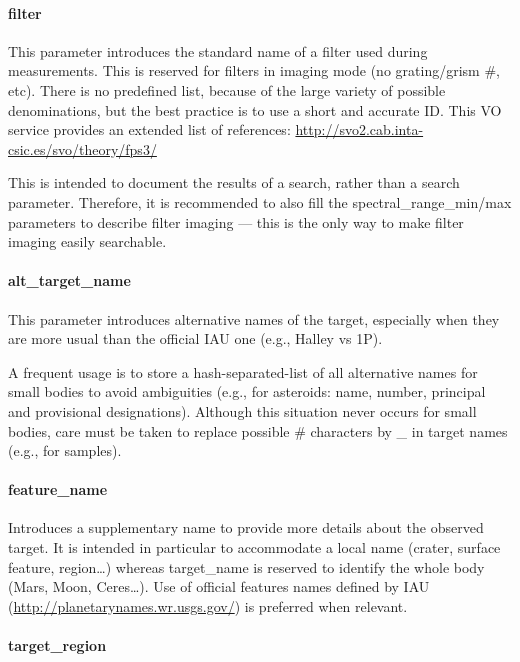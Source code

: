 \documentclass[11pt,a4paper]{ivoa}
\begin{document}
\paragraph{filter}

This parameter introduces the standard name of a filter used during
measurements. This is reserved for filters in imaging mode (no
grating/grism \#, etc). There is no predefined list, because of the large
variety of possible denominations, but the best practice is to use a short
and accurate ID. This VO service provides an extended list of references:
\url{http://svo2.cab.inta-csic.es/svo/theory/fps3/}

This is intended to document the results of a search, rather than
a search parameter. Therefore, it is recommended to also fill the
spectral\_range\_min/max parameters to describe filter imaging --- this
is the only way to make filter imaging easily searchable.

\paragraph{alt\_target\_name}

This parameter introduces alternative names of the target, especially
when they are more usual than the official IAU one (e.g., Halley vs 1P).

A frequent usage is to store a hash-separated-list of all alternative
names for small bodies to avoid ambiguities (e.g., for asteroids: name,
number, principal and provisional designations). Although this situation
never occurs for small bodies, care must be taken to replace possible \#
characters by \_ in target names (e.g., for samples).

\paragraph{feature\_name}

Introduces a supplementary name to provide more details
about the observed target. It is intended in particular to
accommodate a local name (crater, surface feature, region…)
whereas target\_name is reserved to identify the whole body
(Mars, Moon, Ceres…). Use of official features names defined by IAU
(\url{http://planetarynames.wr.usgs.gov/})
is preferred when relevant.

\paragraph{target\_region}
\end{document}
